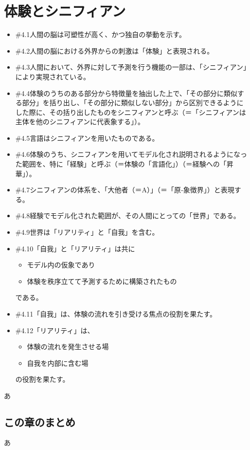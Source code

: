 \section{体験とシニフィアン}\label{ux4f53ux9a13ux3068ux30b7ux30cbux30d5ux30a3ux30a2ux30f3}

\begin{note}{}
  \begin{itemize}
    \tightlist
    \item{\#4.1}人間の脳は可塑性が高く、かつ独自の挙動を示す。
    \item{\#4.2}人間の脳における外界からの刺激は「体験」と表現される。
    \item{\#4.3}人間において、外界に対して予測を行う機能の一部は、「シニフィアン」により実現されている。
    \item{\#4.4}体験のうちのある部分から特徴量を抽出した上で、「その部分に類似する部分」を括り出し、「その部分に類似しない部分」から区別できるようにした際に、その括り出したものをシニフィアンと呼ぶ（＝「シニフィアンは主体を他のシニフィアンに代表象する」）。
    \item{\#4.5}言語はシニフィアンを用いたものである。
    \item{\#4.6}体験のうち、シニフィアンを用いてモデル化され説明されるようになった範囲を、特に「経験」と呼ぶ（＝体験の「言語化」）（＝経験への「昇華」）。
    \item{\#4.7}シニフィアンの体系を、「大他者（＝A）」（＝「原‐象徴界」）と表現する。
    \item{\#4.8}経験でモデル化された範囲が、その人間にとっての「世界」である。
    \item{\#4.9}世界は「リアリティ」と「自我」を含む。
    \item{\#4.10}「自我」と「リアリティ」は共に
      \begin{itemize}
        \tightlist
        \item モデル内の仮象であり
        \item 体験を秩序立てて予測するために構築されたもの
      \end{itemize}である。
    \item{\#4.11}「自我」は、体験の流れを引き受ける焦点の役割を果たす。
    \item{\#4.12}「リアリティ」は、
      \begin{itemize}
        \tightlist
        \item 体験の流れを発生させる場
        \item 自我を内部に含む場
      \end{itemize}の役割を果たす。
  \end{itemize}
\end{note}

あ

\subsection{この章のまとめ}\label{ux3053ux306eux7ae0ux306eux307eux3068ux3081}

あ
